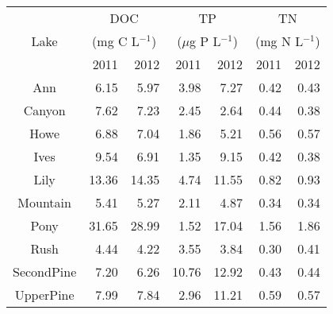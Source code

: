 \begin{table}[ht]
\centering
\begin{tabular}{crrrrrr}
  \hline
\hline
   & \multicolumn{2}{c}{DOC} & 
                      \multicolumn{2}{c}{TP} & 
                      \multicolumn{2}{c}{TN}\\
 Lake & \multicolumn{2}{c}{(mg C L$^{-1}$)} & 
                      \multicolumn{2}{c}{($\mu$g P L$^{-1}$)} & 
                      \multicolumn{2}{c}{(mg N L$^{-1}$)}\\
  & 2011 & 2012 & 2011 & 2012 & 2011 & 2012 \\
 \hline
Ann & 6.15 & 5.97 & 3.98 & 7.27 & 0.42 & 0.43 \\ 
  Canyon & 7.62 & 7.23 & 2.45 & 2.64 & 0.44 & 0.38 \\ 
  Howe & 6.88 & 7.04 & 1.86 & 5.21 & 0.56 & 0.57 \\ 
  Ives & 9.54 & 6.91 & 1.35 & 9.15 & 0.42 & 0.38 \\ 
  Lily & 13.36 & 14.35 & 4.74 & 11.55 & 0.82 & 0.93 \\ 
  Mountain & 5.41 & 5.27 & 2.11 & 4.87 & 0.34 & 0.34 \\ 
  Pony & 31.65 & 28.99 & 1.52 & 17.04 & 1.56 & 1.86 \\ 
  Rush & 4.44 & 4.22 & 3.55 & 3.84 & 0.30 & 0.41 \\ 
  SecondPine & 7.20 & 6.26 & 10.76 & 12.92 & 0.43 & 0.44 \\ 
  UpperPine & 7.99 & 7.84 & 2.96 & 11.21 & 0.59 & 0.57 \\ 
   \hline
\end{tabular}
\end{table}
